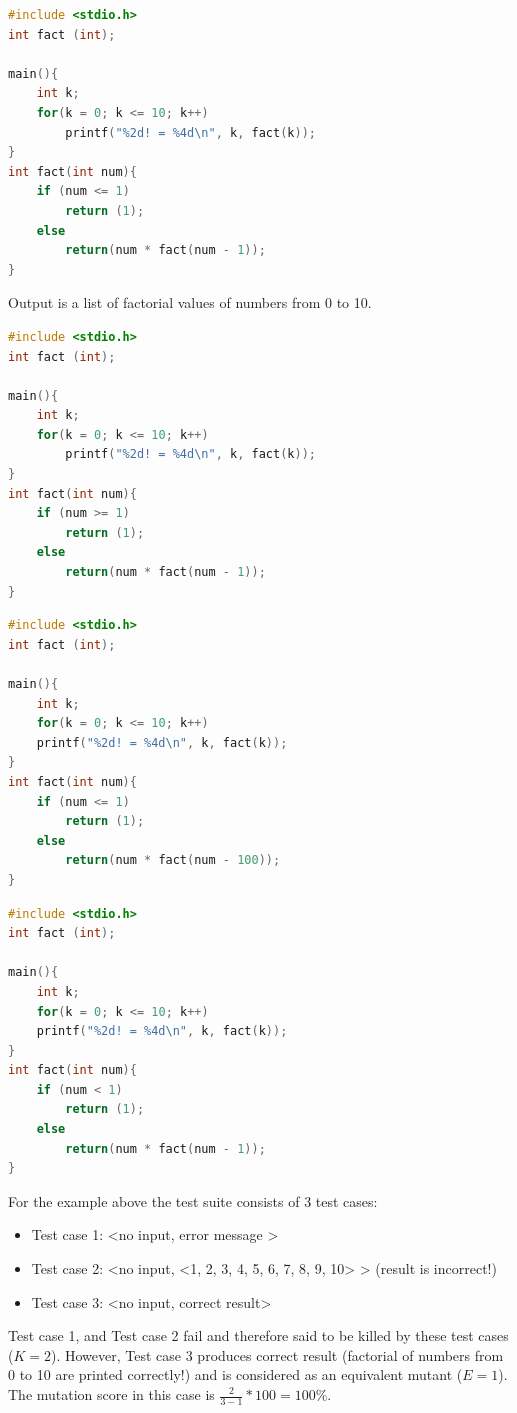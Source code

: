 \begin{Answer}
\begin{lstlisting}[language=C, caption={A recursive C program to compute and print  0!, 1!,...,10!}]
#include <stdio.h>
int fact (int);

main(){
	int k;
	for(k = 0; k <= 10; k++)
		printf("%2d! = %4d\n", k, fact(k));
}
int fact(int num){
	if (num <= 1)
		return (1);
	else
		return(num * fact(num - 1));
}
\end{lstlisting}
Output is a list of factorial values of numbers from 0 to 10.
\begin{lstlisting}[language=C, caption={Mutant 1: (Decision mutation - Change num <= 1 to num < 1)}]
#include <stdio.h>
int fact (int);

main(){
	int k;
	for(k = 0; k <= 10; k++)
		printf("%2d! = %4d\n", k, fact(k));
}
int fact(int num){
	if (num >= 1)
		return (1);
	else
		return(num * fact(num - 1));
}
\end{lstlisting}
\begin{lstlisting}[language=C, caption={Mutant 2: (Value mutation - Change fact(num –  1) to fact(num  - 100))}]
#include <stdio.h>
int fact (int);

main(){
	int k;
	for(k = 0; k <= 10; k++)
	printf("%2d! = %4d\n", k, fact(k));
}
int fact(int num){
	if (num <= 1)
		return (1);
	else
		return(num * fact(num - 100));
}
\end{lstlisting}
\begin{lstlisting}[language=C, caption={Mutant 3: (Decision mutant – Change  if (num <= 1) to if (num < 1))}]
#include <stdio.h>
int fact (int);

main(){
	int k;
	for(k = 0; k <= 10; k++)
	printf("%2d! = %4d\n", k, fact(k));
}
int fact(int num){
	if (num < 1)
		return (1);
	else
		return(num * fact(num - 1));
}
\end{lstlisting}
For the example above the test suite consists of 3 test cases:

\begin{itemize}
 \item Test case 1: <no input, error message >
 \item Test case 2: <no input, <1, 2, 3, 4, 5, 6, 7, 8, 9, 10> > (result is incorrect!)
\item Test case 3: <no input, correct result>
\end{itemize}
Test case 1, and Test case 2 fail and therefore said to be killed by these test cases ($K=2$). However, Test case 3 produces correct result (factorial of numbers from 0 to 10 are printed correctly!) and is considered as an equivalent mutant ($E=1$). The mutation score in this case is $\frac{2}{3 - 1} * 100 = 100\%$.
\end{Answer}
